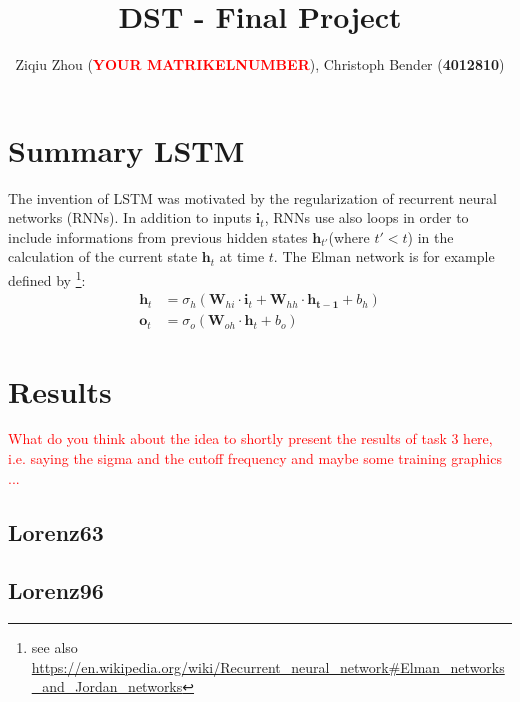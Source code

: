 \documentclass{scrarticle}
\title{DST - Final Project}
\author{Ziqiu Zhou (\textbf{\textcolor{red}{YOUR MATRIKELNUMBER}}), Christoph Bender (\textbf{4012810})}
\begin{document}
	\maketitle
	\clearpage
	\section{Summary LSTM \cite{Vlachas}}
	The invention of LSTM was motivated by the regularization of recurrent neural networks (RNNs). In addition to inputs $\bm{i}_t$, RNNs use also loops in order to include informations from previous hidden states $\bm{h}_{t'}$(where $t'<t$) in the calculation of the current state $\bm{h}_t$ at time $t$. The Elman network \cite{Elman} is for example defined by \footnote{see also \url{https://en.wikipedia.org/wiki/Recurrent_neural_network\#Elman_networks_and_Jordan_networks}}: 
	\begin{align}
		\bm{h}_t&=\sigma_h(\bm{W}_{hi}\cdot\bm{i}_t+\bm{W}_{hh}\cdot\bm{h_{t-1}}+b_h) \\
		\bm{o}_t&=\sigma_o(\bm{W}_{oh}\cdot\bm{h}_t+b_o)
	\end{align}
	\section{Results}
	\textcolor{red}{What do you think about the idea to shortly present the results of task 3 here, i.e. saying the sigma and the cutoff frequency and maybe some training graphics ...}
	\subsection{Lorenz63}
	\subsection{Lorenz96}
	
	\printbibliography
\end{document}
